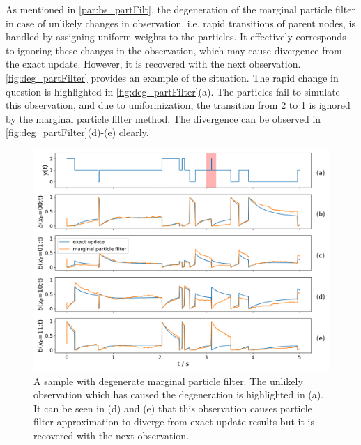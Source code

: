 As mentioned in \cref{par:bs_partFilt}, the degeneration of the marginal particle filter in case of unlikely changes in observation, i.e. rapid transitions of parent nodes, is handled by assigning uniform weights to the particles. It effectively corresponds to ignoring these changes in the observation, which may cause divergence from the exact update. However, it is recovered with the next observation. \autoref{fig:deg_partFilter} provides an example of the situation. The rapid change in question is highlighted in \autoref{fig:deg_partFilter}(a). The particles fail to simulate this observation, and due to uniformization, the transition from 2 to 1 is ignored by the marginal particle filter method. The divergence can be observed in \autoref{fig:deg_partFilter}(d)-(e) clearly.
\begin{figure}[H]
	\begin{center}
		\includegraphics[width=.9\textwidth]{figures/degenerate_pf/belief_traj}
		\caption[Degenerate marginal particle filter]{A sample with degenerate marginal particle filter. The unlikely observation which has caused the degeneration is highlighted in (a). It can be seen in (d) and (e) that this observation causes particle filter approximation to diverge from exact update results but it is recovered with the next observation.}
		\label{fig:deg_partFilter}
	\end{center}
\end{figure}

